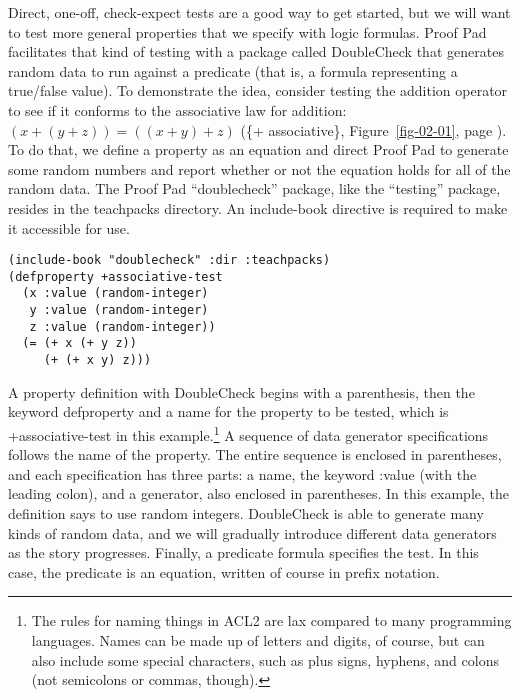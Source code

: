 Direct, one-off, \textsf{check-expect} tests
are a good way to get started, but
we will want to test more general properties that we specify with logic formulas.
Proof Pad facilitates that kind of testing 
with a package called
DoubleCheck
that generates 
random data
to run against a predicate
(that is, a formula representing a true/false value).
To demonstrate the idea, consider testing the addition operator to see if
it conforms to the associative law for addition: $(x + (y + z)) = ((x + y) + z)$
(\{+ associative\}, Figure~\ref{fig-02-01}, page \pageref{fig-02-01}).
To do that, we define a property as an equation
and direct Proof Pad to generate some random numbers and
report whether or not the equation holds for all of the random data.
The Proof Pad ``doublecheck'' package,
like the ``testing'' package,
resides in the
teachpacks directory.
An \textsf{include-book} directive is required to make it accessible for use.

\begin{Verbatim}
(include-book "doublecheck" :dir :teachpacks)
(defproperty +associative-test
  (x :value (random-integer)
   y :value (random-integer)
   z :value (random-integer))
  (= (+ x (+ y z))
     (+ (+ x y) z)))
\end{Verbatim}

A property definition with
DoubleCheck begins with a parenthesis, then the keyword
\textsf{defproperty} 
and a name for the property to be tested,
which is \textsf{+associative-test} in this example.\footnote{The
rules for naming things in ACL2 are lax compared to many
programming languages. Names can be made up of letters and digits, of course,
but can also include some special characters,
such as plus signs, hyphens, and colons (not semicolons or commas, though).}
A sequence of data generator specifications follows the name of the property.
The entire sequence is enclosed in parentheses,
and each specification has three parts: a name, 
the keyword \textsf{:value} (with the leading colon),
and a generator, also enclosed in parentheses.
In this example, the definition says to use random integers.
DoubleCheck is able to generate many kinds of random data,
and we will gradually introduce different data generators as the story progresses.
Finally, a predicate formula specifies the test.
In this case, the predicate is an equation,
written of course in prefix notation.


